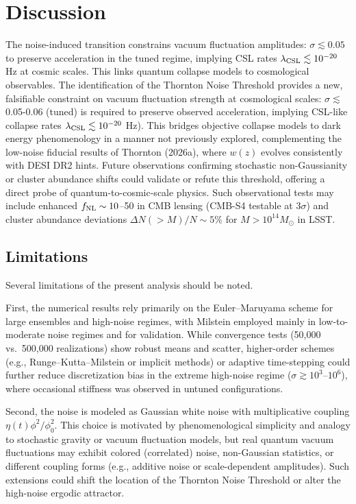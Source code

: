 \documentclass[preprint]{aastex7}
\begin{document}
\section{Discussion}
The noise-induced transition constrains vacuum fluctuation amplitudes: \( \sigma \lesssim 0.05 \) to preserve acceleration in the tuned regime, implying CSL rates \( \lambda_{\rm CSL} \lesssim 10^{-20} \) Hz at cosmic scales. This links quantum collapse models to cosmological observables. The identification of the Thornton Noise Threshold provides a new, falsifiable constraint on vacuum fluctuation strength at cosmological scales: \( \sigma  \lesssim \) 0.05-0.06 (tuned) is required to preserve observed acceleration, implying CSL-like collapse rates \( \lambda_{\rm CSL} \lesssim 10^{-20} \) Hz). This bridges objective collapse models to dark energy phenomenology in a manner not previously explored, complementing the low-noise fiducial results of Thornton (2026a), where \( w(z) \) evolves consistently with DESI DR2 hints. Future observations confirming stochastic non-Gaussianity or cluster abundance shifts could validate or refute this threshold, offering a direct probe of quantum-to-cosmic-scale physics. Such observational tests may include enhanced \( f_{\rm NL} \sim 10 \)--50 in CMB lensing (CMB-S4 testable at $3\sigma$) and cluster abundance deviations \( \Delta N(> M)/N \sim 5\% \) for \( M > 10^{14} M_\odot \) in LSST. 

\subsection{Limitations}

Several limitations of the present analysis should be noted.

First, the numerical results rely primarily on the Euler--Maruyama scheme for large ensembles and high-noise regimes, with Milstein employed mainly in low-to-moderate noise regimes and for validation. While convergence tests (50,000 vs.\ 500,000 realizations) show robust means and scatter, higher-order schemes (e.g., Runge--Kutta--Milstein or implicit methods) or adaptive time-stepping could further reduce discretization bias in the extreme high-noise regime (\( \sigma \gtrsim 10^3 \)--$10^6$), where occasional stiffness was observed in untuned configurations.

Second, the noise is modeled as Gaussian white noise with multiplicative coupling \( \eta(t)\phi^2 / \phi_0^2 \). This choice is motivated by phenomenological simplicity and analogy to stochastic gravity or vacuum fluctuation models, but real quantum vacuum fluctuations may exhibit colored (correlated) noise, non-Gaussian statistics, or different coupling forms (e.g., additive noise or scale-dependent amplitudes). Such extensions could shift the location of the Thornton Noise Threshold or alter the high-noise ergodic attractor.
\end{document}
